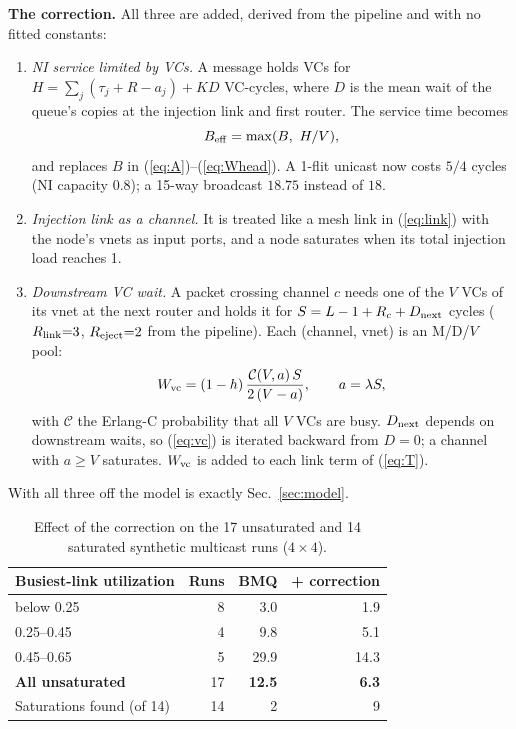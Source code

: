\documentclass[conference]{IEEEtran}
\begin{document}
\textbf{The correction.} All three are added, derived from the pipeline and with no fitted constants:
\begin{enumerate}
\item \emph{NI service limited by VCs.} A message holds VCs for $H=\sum_j(\tau_j+R-a_j)+K D$ VC-cycles, where $D$ is the mean wait of the queue's copies at the injection link and first router. The service time becomes
\begin{equation}
B_{\rm eff}=\max(B,\ H/V),
\label{eq:Beff}
\end{equation}
and replaces $B$ in (\ref{eq:A})--(\ref{eq:Whead}). A 1-flit unicast now costs $5/4$ cycles (NI capacity 0.8); a 15-way broadcast $18.75$ instead of $18$.
\item \emph{Injection link as a channel.} It is treated like a mesh link in (\ref{eq:link}) with the node's vnets as input ports, and a node saturates when its total injection load reaches 1.
\item \emph{Downstream VC wait.} A packet crossing channel $c$ needs one of the $V$ VCs of its vnet at the next router and holds it for $S=L-1+R_c+D_{\rm next}$ cycles ($R_{\rm link}{=}3$, $R_{\rm eject}{=}2$ from the pipeline). Each (channel, vnet) is an M/D/$V$ pool:
\begin{equation}
W_{\rm vc}=(1-h)\,\frac{\mathcal C(V,a)\,S}{2\,(V-a)},\qquad a=\lambda S,
\label{eq:vc}
\end{equation}
with $\mathcal C$ the Erlang-C probability that all $V$ VCs are busy. $D_{\rm next}$ depends on downstream waits, so (\ref{eq:vc}) is iterated backward from $D{=}0$; a channel with $a\ge V$ saturates. $W_{\rm vc}$ is added to each link term of (\ref{eq:T}).
\end{enumerate}
With all three off the model is exactly Sec.~\ref{sec:model}.

\begin{table}[t]
\centering\footnotesize
\caption{Effect of the correction on the 17 unsaturated and 14 saturated synthetic multicast runs ($4{\times}4$).}
\label{tab:corr}
\begin{tabular}{@{}lrrr@{}}
\toprule
Busiest-link utilization & Runs & BMQ & + correction \\
\midrule
below 0.25 & 8 & 3.0 & 1.9 \\
0.25--0.45 & 4 & 9.8 & 5.1 \\
0.45--0.65 & 5 & 29.9 & 14.3 \\
\textbf{All unsaturated} & 17 & \textbf{12.5} & \textbf{6.3} \\
Saturations found (of 14) & 14 & 2 & 9 \\
\bottomrule
\end{tabular}
\end{table}
\end{document}
